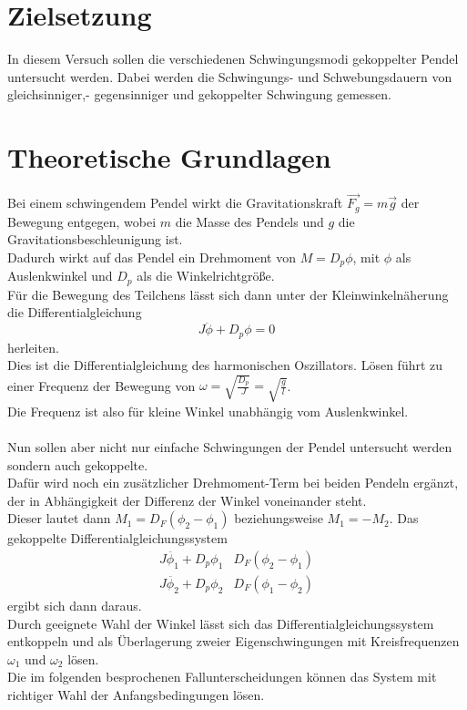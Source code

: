\section{Zielsetzung}

In diesem Versuch sollen die verschiedenen Schwingungsmodi gekoppelter Pendel untersucht werden.
Dabei werden die Schwingungs- und Schwebungsdauern von gleichsinniger,- gegensinniger und gekoppelter Schwingung gemessen.

\section{Theoretische Grundlagen}

Bei einem schwingendem Pendel wirkt die Gravitationskraft $\vec{F_g}=m \vec{g} $ der Bewegung entgegen, wobei $m$ die Masse des Pendels und $g$ die Gravitationsbeschleunigung ist.\\
Dadurch wirkt auf das Pendel ein Drehmoment von $M= D_p\phi$,  mit $\phi$ als Auslenkwinkel und $D_p$ als die Winkelrichtgröße.\\
Für die Bewegung des Teilchens lässt sich dann unter der Kleinwinkelnäherung die Differentialgleichung 
\begin{equation*}
    J \ddot{\phi} + D_p \phi=0
\end{equation*}
herleiten.\\
Dies ist die Differentialgleichung des harmonischen Oszillators. Lösen führt zu einer Frequenz der Bewegung von $\omega= \sqrt{\frac{D_p}{J}}=\sqrt{\frac{g}{l}}$.\\
Die Frequenz ist also für kleine Winkel unabhängig vom Auslenkwinkel.\\\\

\noindent
Nun sollen aber nicht nur einfache Schwingungen der Pendel untersucht werden sondern auch gekoppelte.\\
Dafür wird noch ein zusätzlicher Drehmoment-Term bei beiden Pendeln ergänzt, der in Abhängigkeit der Differenz der Winkel voneinander steht.\\
Dieser lautet dann $M_1=D_F (\phi_2 -\phi_1)$ beziehungsweise $M_1=-M_2$.
Das gekoppelte Differentialgleichungssystem
\begin{align*}
    J \ddot{\phi_1} + D_p \phi_1 & D_F (\phi_2 -\phi_1)\\
    J \ddot{\phi_2} + D_p \phi_2 & D_F (\phi_1 -\phi_2)
\end{align*}
ergibt sich dann daraus.\\
Durch geeignete Wahl der Winkel lässt sich das Differentialgleichungssystem entkoppeln und als Überlagerung zweier Eigenschwingungen mit Kreisfrequenzen $\omega_1$ und $\omega_2$ lösen.\\
Die im folgenden besprochenen Fallunterscheidungen können das System mit richtiger Wahl der Anfangsbedingungen lösen.

